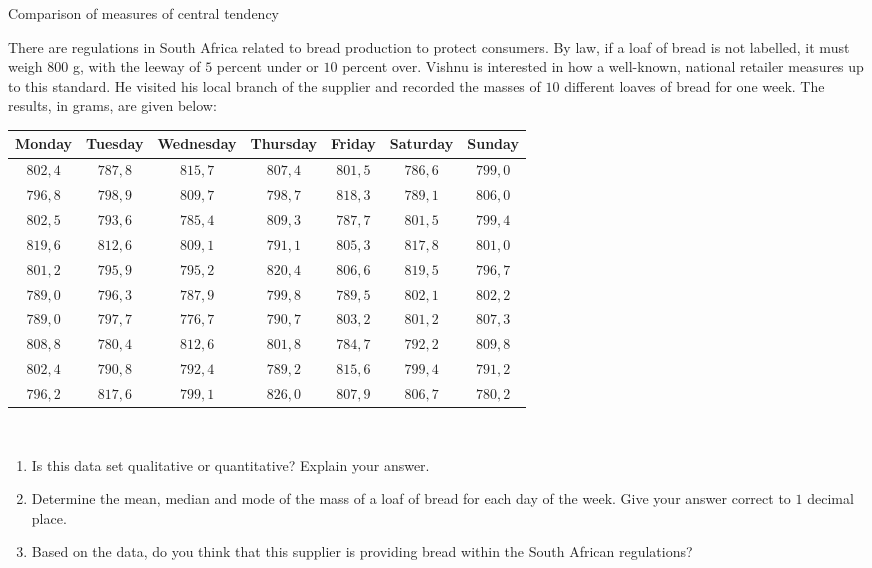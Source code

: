 \begin{wex}{Comparison of measures of central tendency}
{There are regulations in South Africa related to bread production
    to protect consumers. By law, if a loaf of bread is not labelled,
    it must weigh $800$ g, with the leeway of $5$ percent under or $10$
    percent over.  Vishnu is interested in how a well-known, national
    retailer measures up to this standard. He visited his local branch
    of the supplier and recorded the masses of $10$ different loaves
    of bread for one week. The results, in grams, are given below:\\

    \begin{center}
      \begin{tabular}{|c|c|c|c|c|c|c|} \hline
       
        \textbf{Monday} & \textbf{Tuesday} & \textbf{Wednesday} & \textbf{Thursday} & \textbf{Friday} & \textbf{Saturday} & \textbf{Sunday} \\ \hline
        
        $802,4$ & $787,8$ & $815,7$ & $807,4$ & $801,5$ & $786,6$ & $799,0$ \\ \hline
        $796,8$ & $798,9$ & $809,7$ & $798,7$ & $818,3$ & $789,1$ & $806,0$ \\ \hline
        $802,5$ & $793,6$ & $785,4$ & $809,3$ & $787,7$ & $801,5$ & $799,4$ \\ \hline
        $819,6$ & $812,6$ & $809,1$ & $791,1$ & $805,3$ & $817,8$ & $801,0$ \\ \hline
        $801,2$ & $795,9$ & $795,2$ & $820,4$ & $806,6$ & $819,5$ & $796,7$ \\ \hline
        $789,0$ & $796,3$ & $787,9$ & $799,8$ & $789,5$ & $802,1$ & $802,2$ \\ \hline
        $789,0$ & $797,7$ & $776,7$ & $790,7$ & $803,2$ & $801,2$ & $807,3$ \\ \hline
        $808,8$ & $780,4$ & $812,6$ & $801,8$ & $784,7$ & $792,2$ & $809,8$ \\ \hline
        $802,4$ & $790,8$ & $792,4$ & $789,2$ & $815,6$ & $799,4$ & $791,2$ \\ \hline
        $796,2$ & $817,6$ & $799,1$ & $826,0$ & $807,9$ & $806,7$ & $780,2$ \\ \hline
       
      \end{tabular}
    \end{center}
\vspace{8pt}\\
    \begin{enumerate}[noitemsep, label=\textbf{\arabic*}.]
    \item Is this data set qualitative or quantitative? Explain your
      answer.
    \item Determine the mean, median and mode of the mass of a loaf of bread
      for each day of the week. Give your answer correct to $1$ decimal place.
    \item Based on the data, do you think that this supplier is
      providing bread within the South African regulations?
    \end{enumerate}
}{

}
\end{wex}

